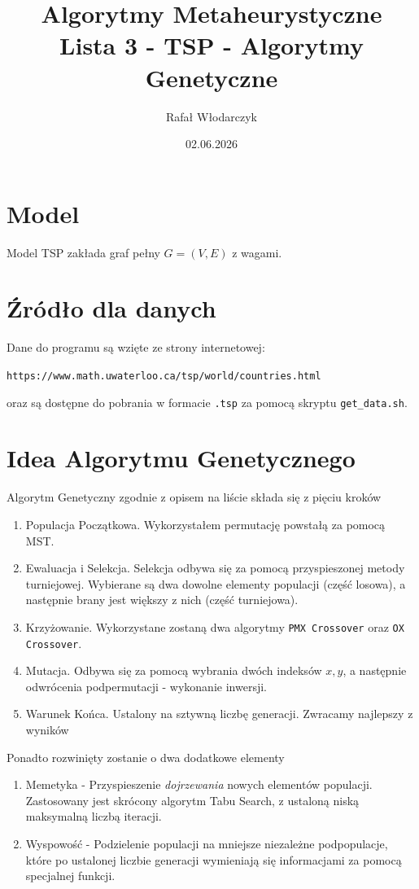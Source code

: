 \documentclass{article}
\title{Algorytmy Metaheurystyczne\\Lista 3 - TSP - Algorytmy Genetyczne}
\author{Rafał Włodarczyk}
\date{02.06.2026}
\begin{document}
\maketitle

\tableofcontents

\section{Model}

Model TSP zakłada graf pełny $G=(V,E)$ z wagami.

\section{Źródło dla danych}

Dane do programu są wzięte ze strony internetowej:
\begin{center}
\texttt{https://www.math.uwaterloo.ca/tsp/world/countries.html}
\end{center}
oraz są dostępne do pobrania w formacie \texttt{.tsp} za pomocą skryptu \texttt{get\_data.sh}.

\section{Idea Algorytmu Genetycznego}

Algorytm Genetyczny zgodnie z opisem na liście składa się z pięciu kroków
\begin{enumerate}
    \item Populacja Początkowa. Wykorzystałem permutację powstałą za pomocą MST.
    \item Ewaluacja i Selekcja. Selekcja odbywa się za pomocą przyspieszonej metody turniejowej.
    Wybierane są dwa dowolne elementy populacji (część losowa), a następnie brany jest większy z nich (część turniejowa).
    \item Krzyżowanie. Wykorzystane zostaną dwa algorytmy \texttt{PMX Crossover} oraz \texttt{OX Crossover}.
    \item Mutacja. Odbywa się za pomocą wybrania dwóch indeksów $x,y$, a następnie odwrócenia podpermutacji - 
    wykonanie inwersji.
    \item Warunek Końca. Ustalony na sztywną liczbę generacji. Zwracamy najlepszy z wyników
\end{enumerate}

Ponadto rozwinięty zostanie o dwa dodatkowe elementy

\begin{enumerate}
    \item Memetyka - Przyspieszenie \textit{dojrzewania} nowych elementów populacji. Zastosowany jest skrócony algorytm Tabu Search,
    z ustaloną niską maksymalną liczbą iteracji.
    \item Wyspowość - Podzielenie populacji na mniejsze niezależne podpopulacje, które po ustalonej liczbie generacji wymieniają się informacjami
    za pomocą specjalnej funkcji.
\end{enumerate}
\end{document}
